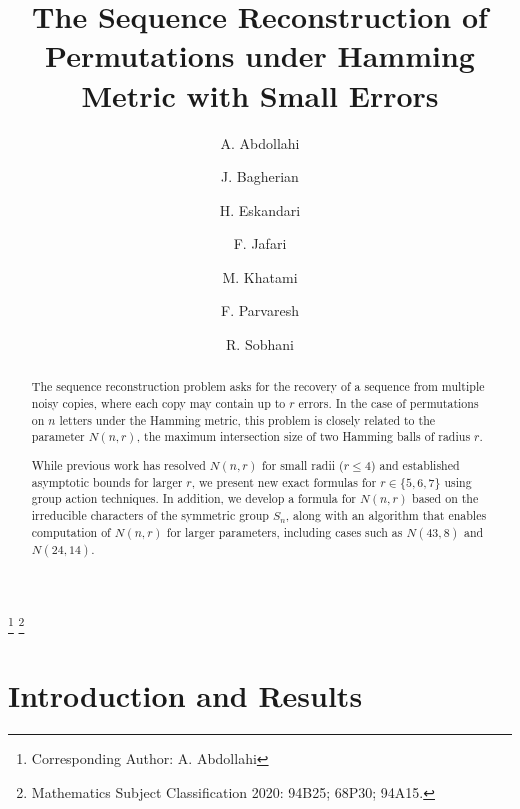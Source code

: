 \documentclass{amsart}
\numberwithin{equation}{section}
\newcommand\blfootnote[1]{%
  \begingroup
  \renewcommand\thefootnote{}\footnote{#1}%
  \addtocounter{footnote}{-1}%
  \endgroup
}
\begin{document}
\title[Reconstruction of Permutations]{The Sequence Reconstruction of Permutations under Hamming Metric with Small Errors}
\author[\tiny{Abdollahi}]{A. Abdollahi}%
\author[\tiny{Bagherian}]{J. Bagherian}
\author[\tiny{Eskandari}]{H. Eskandari}%
\author[\tiny{Jafari}]{F. Jafari}
\author[\tiny{Khatami}]{M. Khatami}%
\address{Department of Pure Mathematics, Faculty of Mathematics and Statistics,  University of Isfahan, Isfahan 81746-73441, Iran.}%
%
%
\author[\tiny{Parvaresh}]{F. Parvaresh}
\address{ Department of Electrical Engineering, Faculty
of Engineering, University of Isfahan, Isfahan 81746-73441, Iran.}
\author[\tiny{Sobhani}]{R. Sobhani}%
\address{Department of Applied Mathematics and Computer Science, Faculty of Mathematics and Statistics,  University of Isfahan, Isfahan 81746-73441, Iran.}%
\thanks{Corresponding Author: A. Abdollahi}
\blfootnote{Mathematics Subject Classification 2020: 94B25; 68P30; 94A15.}

\begin{abstract}
The sequence reconstruction problem asks for the recovery of a sequence from multiple noisy copies, where each copy may contain up to $r$ errors. In the case of permutations on \(n\) letters under the Hamming metric, this problem is closely related to the parameter $N(n,r)$, the maximum intersection size of two Hamming balls of radius $r$.

While previous work has resolved \(N(n,r)\) for small radii (\(r \leq 4\)) and established asymptotic bounds for larger \(r\), we present new exact formulas for \(r \in \{5,6,7\}\) using  group action techniques. In addition, we develop a  formula for \(N(n,r)\) based on the irreducible characters of the symmetric group \(S_n\), along with an algorithm that enables computation of \(N(n,r)\) for larger parameters, including cases such as \(N(43,8)\) and \(N(24,14)\).
\end{abstract}
\maketitle
\section{Introduction and Results}
\end{document}

